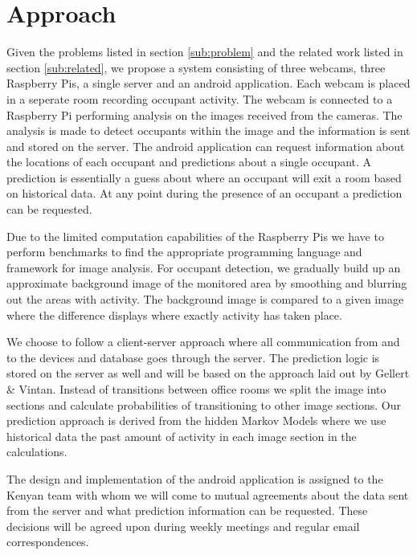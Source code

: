 \section{Approach}

Given the problems listed in section \ref{sub:problem} and the related work listed in section \ref{sub:related}, we propose a system consisting of three webcams, three Raspberry Pis, a single server and an android application. Each webcam is placed in a seperate room recording occupant activity. The webcam is connected to a Raspberry Pi performing analysis on the images received from the cameras. The analysis is made to detect occupants within the image and the information is sent and stored on the server. The android application can request information about the locations of each occupant and predictions about a single occupant. A prediction is essentially a guess about where an occupant will exit a room based on historical data. At any point during the presence of an occupant a prediction can be requested.

Due to the limited computation capabilities of the Raspberry Pis we have to perform benchmarks to find the appropriate programming language and framework for image analysis. For occupant detection, we gradually build up an approximate background image of the monitored area by smoothing and blurring out the areas with activity. The background image is compared to a given image where the difference displays where exactly activity has taken place.

We choose to follow a client-server approach where all communication from and to the devices and database goes through the server. The prediction logic is stored on the server as well and will be based on the approach laid out by Gellert \& Vintan\cite{gellert}. Instead of transitions between office rooms we split the image into sections and calculate probabilities of transitioning to other image sections. Our prediction approach is derived from the hidden Markov Models where we use historical data the past amount of activity in each image section in the calculations.

The design and implementation of the android application is assigned to the Kenyan team with whom we will come to mutual agreements about the data sent from the server and what prediction information can be requested. These decisions will be agreed upon during weekly meetings and regular email correspondences.

